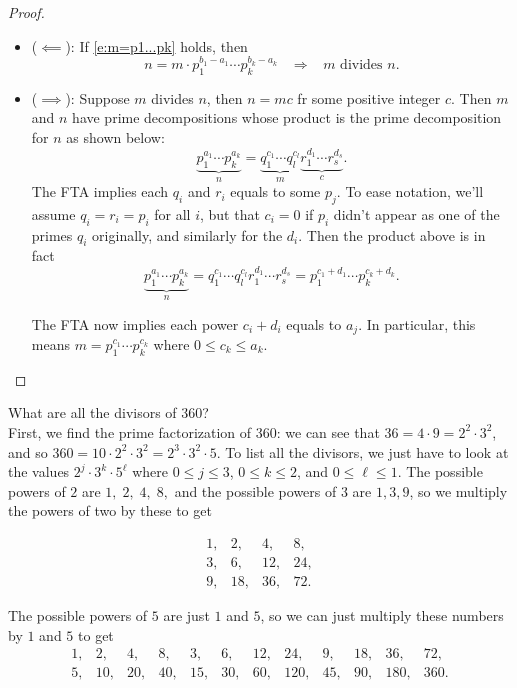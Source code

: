 \documentclass[11pt,dvipsnames]{book}
\numberwithin{figure}{section} %
\numberwithin{table}{section} %
\begin{document}
\begin{proof}
\begin{itemize}
\item  ($\impliedby$): If \eqref{e:m=p1...pk} holds, then
\[
n=m \cdot  p_1^{b_1-a_{1}}\cdots p_k^{b_k-a_{k}} \;\;\; \Longrightarrow \;\;\; m \text{ divides }n.
\]
 \item ($\implies$): Suppose $m$ divides $n$, then $n=mc$ fr some positive integer $c$.  Then $m$ and $n$ have prime decompositions whose product is the prime decomposition for $n$ as shown below:
$$\underbrace{p_1^{a_1}\cdots p_k^{a_k}}_n = \underbrace{q_1^{c_1}\cdots q_l^{c_l}}_m\underbrace{r_1^{d_1}\cdots r_s^{d_s}}_c.$$
The FTA implies each $q_i$ and $r_i$ equals to some $p_j$. To ease notation, we'll assume $q_{i}=r_{i}=p_{i}$ for all $i$, but that $c_{i}=0$ if $p_{i}$ didn't appear as one of the primes $q_{i}$ originally, and similarly for the $d_{i}$. Then the product above is in fact
$$\underbrace{p_1^{a_1}\cdots p_k^{a_k}}_n = {q_1^{c_1}\cdots q_l^{c_l}}{r_1^{d_1}\cdots r_s^{d_s}}
=p_{1}^{c_{1}+d_{1}}\cdots p_{k}^{c_{k}+d_{k}}.
$$

The FTA now implies each power $c_i+d_i$ equals to $a_j$. In particular, this means $m=p_{1}^{c_{1}}\cdots p_{k}^{c_{k}}$ where $0\leq c_{k}\leq a_{k}$.
  \end{itemize}
\end{proof}

\begin{example}
What are all the divisors of $360$?\\

First, we find the prime factorization of $360$: we can see that $36=4\cdot 9=2^2\cdot 3^2$, and so $360 = 10\cdot 2^2\cdot 3^2 = 2^3\cdot 3^2\cdot 5$. To list all the divisors, we just have to look at the values $2^j\cdot 3^{k}\cdot 5^{\ell}$ where $0\leq j\leq 3$, $0\leq k\leq 2$, and $0\leq \ell\leq 1$. The possible powers of $2$ are $1, \; 2, \; 4, \; 8,$ and the possible powers of $3$ are $1,3,9$, so we multiply the powers of two by these to get

\[
\begin{array}{cccc}
1, &  2, &  4, &  8, \\
3, & 6, &  12, &  24, \\
 9, &  18, &  36, &  72.
 \end{array}
 \]

 The possible powers of $5$ are just $1$ and $5$, so we can just multiply these numbers by $1$ and $5$ to get
 \[
 \begin{array}{cccccccccccc}
1, &  2, &  4, &  8,
& 3, & 6, &  12, &  24,
&  9, &  18, &  36, &  72, \\
5, &  10, &  20, &  40,
& 15, & 30, & 60,  &  120,
&  45, &  90, &  180, &  360.
 \end{array}
 \]
\end{example}
\end{document}
